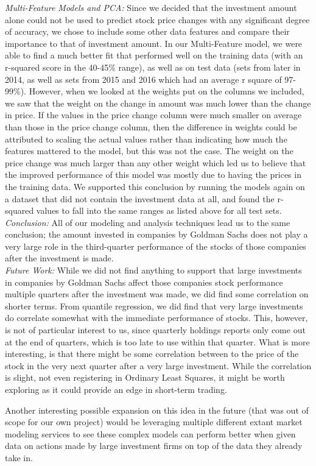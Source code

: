\documentclass{article}
\begin{document}
\begin{multicols}{2}
\textit{Multi-Feature Models and PCA:} Since we decided that the investment amount alone could not be used to predict stock price changes with any significant degree of accuracy, we chose to include some other data features and compare their importance to that of investment amount. In our Multi-Feature model, we were able to find a much better fit that performed well on the training data (with an r-squared score in the 40-45\% range), as well as on test data (sets from later in 2014, as well as sets from 2015 and 2016 which had an average r square of 97-99\%). However, when we looked at the weights put on the columns we included, we saw that the weight on the change in amount was much lower than the change in price. If the values in the price change column were much smaller on average than those in the price change column, then the difference in weights could be attributed to scaling the actual values rather than indicating how much the features mattered to the model, but this was not the case. The weight on the price change was much larger than any other weight which led us to believe that the improved performance of this model was mostly due to having the prices in the training data. We supported this conclusion by running the models again on a dataset that did not contain the investment data at all, and found the r-squared values to fall into the same ranges as listed above for all test sets. \\

\textit{Conclusion: } All of our modeling and analysis techniques lead us to the same conclusion; the amount invested in companies by Goldman Sachs does not play a very large role in the third-quarter performance of the stocks of those companies after the investment is made. \\

\textit{Future Work: } 
While we did not find anything to support that large investments in companies by Goldman Sachs affect those companies stock performance multiple quarters after the investment was made, we did find some correlation on shorter terms. From quantile regression, we did find  that very large investments do correlate somewhat with the immediate performance of stocks. This, however, is not of particular interest to us, since quarterly holdings reports only come out at the end of quarters, which is too late to use within that quarter. What is more interesting, is that there might be some correlation between to the price of the stock in the very next quarter after a very large investment. While the correlation is slight, not even registering in Ordinary Least Squares, it might be worth exploring as it could provide an edge in short-term trading.

Another interesting possible expansion on this idea in the future  (that was out of scope for our own project) would be leveraging multiple different extant market modeling services to see these complex models can perform better when given data on actions made by large investment firms on top of the data they already take in. 


\end{multicols}
\end{document}
